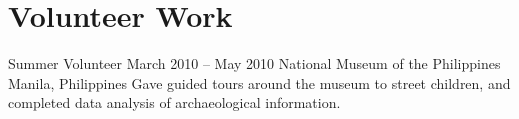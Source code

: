 \section*{Volunteer Work}

\volunteer
  {Summer Volunteer}
  {March 2010 -- May 2010}
  {National Museum of the Philippines}
  {Manila, Philippines}
  {Gave guided tours around the museum to street children, and completed data analysis of archaeological information.}
 